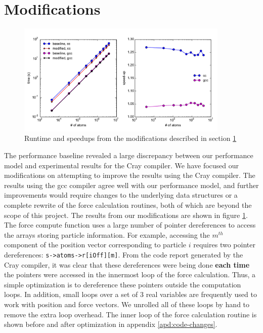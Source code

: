\documentclass[12pt]{article}
\begin{document}
\section{Modifications}
\label{sec:mods}

\begin{figure}[h!]
  \centering
  \includegraphics[width=0.9\textwidth]{../figs/modified_forceLJ.pdf}
  \caption{Runtime and speedups from the modifications described in
   section \ref{sec:mods}}
   \label{fig:mod-force}
\end{figure}

The performance baseline revealed a large discrepancy between our
performance model and experimental results for the Cray compiler. We
have focused our modifications on attempting to improve the results
using the Cray compiler. The results using the gcc compiler agree well
with our performance model, and further improvements would require
changes to the underlying data structures or a complete rewrite of the
force calculation routines, both of which are beyond the scope of this
project. The results from our modifications are shown in figure
\ref{fig:mod-force}.
\\

The force compute function uses a large number of pointer dereferences
to access the arrays storing particle information. For example,
accessing the $m^{th}$ component of the position vector corresponding
to particle $i$ requires two pointer dereferences:
\texttt{s->atoms->r[iOff][m]}. From the code report generated by the
Cray compiler, it was clear that these dereferences were being done
{\bf each time} the pointers were accessed in the innermost loop of
the force calculation.  Thus, a simple optimization is to dereference
these pointers outside the computation loops.  In addition, small
loops over a set of 3 real variables are frequently used to work with
position and force vectors. We unrolled all of these loops by hand to
remove the extra loop overhead. The inner loop of the force
calculation routine is shown before and after optimization in appendix
\ref{apd:code-changes}.
\\
\end{document}
